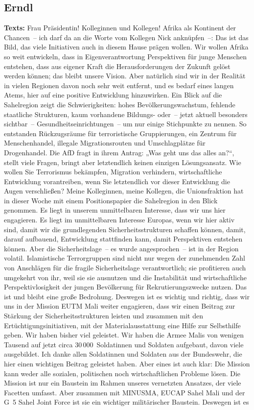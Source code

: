 \documentclass{article}
\begin{document}
\subsection{Erndl}
\noindent\textbf{Texts:} Frau Präsidentin! Kolleginnen und Kollegen! Afrika als Kontinent der Chancen – ich darf da an die Worte vom Kollegen Nick anknüpfen –: Das ist das Bild, das viele Initiativen auch in diesem Hause prägen wollen. Wir wollen Afrika so weit entwickeln, dass in Eigenverantwortung Perspektiven für junge Menschen entstehen, dass aus eigener Kraft die Herausforderungen der Zukunft gelöst werden können; das bleibt unsere Vision. Aber natürlich sind wir in der Realität in vielen Regionen davon noch sehr weit entfernt, und es bedarf eines langen Atems, hier auf eine positive Entwicklung hinzuwirken. Ein Blick auf die Sahelregion zeigt die Schwierigkeiten: hohes Bevölkerungswachstum, fehlende staatliche Strukturen, kaum vorhandene Bildungs- oder – jetzt aktuell besonders sichtbar – Gesundheitseinrichtungen – um nur einige Stichpunkte zu nennen. So entstanden Rückzugsräume für terroristische Gruppierungen, ein Zentrum für Menschenhandel, illegale Migrationsrouten und Umschlagplätze für Drogenhandel. Die AfD fragt in ihrem Antrag: „Was geht uns das alles an?“, stellt viele Fragen, bringt aber letztendlich keinen einzigen Lösungsansatz. Wie wollen Sie Terrorismus bekämpfen, Migration verhindern, wirtschaftliche Entwicklung vorantreiben, wenn Sie letztendlich vor dieser Entwicklung die Augen verschließen? Meine Kolleginnen, meine Kollegen, die Unionsfraktion hat in dieser Woche mit einem Positionspapier die Sahelregion in den Blick genommen. Es liegt in unserem unmittelbaren Interesse, dass wir uns hier engagieren. Es liegt im unmittelbaren Interesse Europas, wenn wir hier aktiv sind, damit wir die grundlegenden Sicherheitsstrukturen schaffen können, damit, darauf aufbauend, Entwicklung stattfinden kann, damit Perspektiven entstehen können. Aber die Sicherheitslage – es wurde angesprochen – ist in der Region volatil. Islamistische Terrorgruppen sind nicht nur wegen der zunehmenden Zahl von Anschlägen für die fragile Sicherheitslage verantwortlich; sie profitieren auch umgekehrt von ihr, weil sie sie ausnutzen und die Instabilität und wirtschaftliche Perspektivlosigkeit der jungen Bevölkerung für Rekrutierungszwecke nutzen. Das ist und bleibt eine große Bedrohung. Deswegen ist es wichtig und richtig, dass wir uns in der Mission EUTM Mali weiter engagieren, dass wir einen Beitrag zur Stärkung der Sicherheitsstrukturen leisten und zusammen mit den Ertüchtigungsinitiativen, mit der Materialausstattung eine Hilfe zur Selbsthilfe geben. Wir haben bisher viel geleistet. Wir haben die Armee Malis von wenigen Tausend auf jetzt circa 30 000 Soldatinnen und Soldaten aufgebaut, davon viele ausgebildet. Ich danke allen Soldatinnen und Soldaten aus der Bundeswehr, die hier einen wichtigen Beitrag geleistet haben. Aber eines ist auch klar: Die Mission kann weder alle sozialen, politischen noch wirtschaftlichen Probleme lösen. Die Mission ist nur ein Baustein im Rahmen unseres vernetzten Ansatzes, der viele Facetten umfasst. Aber zusammen mit MINUSMA, EUCAP Sahel Mali und der G 5 Sahel Joint Force ist sie ein wichtiger militärischer Baustein. Deswegen ist es 
\end{document}
